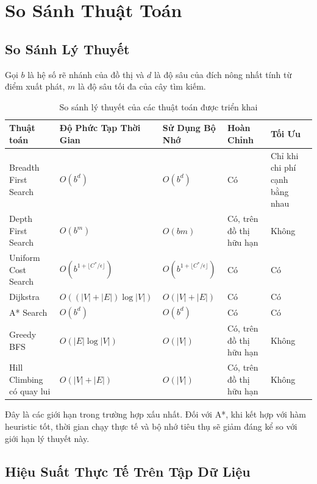 
\chapter{So Sánh Thuật Toán}
\label{chap:algorithm-comparison}

\section{So Sánh Lý Thuyết}

Gọi $b$ là hệ số rẽ nhánh của đồ thị và $d$ là độ sâu của đích nông nhất tính từ điểm xuất phát, $m$ là độ sâu tối đa của cây tìm kiếm.

\begin{table}[h!]
\centering
\caption{So sánh lý thuyết của các thuật toán được triển khai}
\scriptsize
\begin{tabular}{p{3.0cm}p{3.0cm}p{2.8cm}p{1.8cm}p{3.0cm}}
\toprule
Thuật toán & Độ Phức Tạp Thời Gian & Sử Dụng Bộ Nhớ & Hoàn Chỉnh & Tối Ưu \\
\midrule
Breadth First Search & $O(b^d)$ & $O(b^d)$ & Có & Chỉ khi chi phí cạnh bằng nhau \\
Depth First Search & $O(b^m)$ & $O(bm)$ & Có, trên đồ thị hữu hạn & Không \\
Uniform Cost Search & $O(b^{1 + \lfloor C^*/\epsilon \rfloor})$ & $O(b^{1 + \lfloor C^*/\epsilon \rfloor})$ & Có & Có \\
Dijkstra & $O((|V|+|E|)\log |V|)$ & $O(|V|+|E|)$ & Có & Có \\
A* Search & $O(b^d)$ & $O(b^d)$ & Có & Có \\
Greedy BFS & $O(|E|\log |V|)$ & $O(|V|)$ & Có, trên đồ thị hữu hạn & Không \\
Hill Climbing có quay lui & $O(|V|+|E|)$ & $O(|V|)$ & Có, trên đồ thị hữu hạn & Không \\
\bottomrule
\end{tabular}
\end{table}

Đây là các giới hạn trong trường hợp xấu nhất. Đối với A*, khi kết hợp với hàm heuristic tốt, thời gian chạy thực tế và bộ nhớ tiêu thụ sẽ giảm đáng kể so với giới hạn lý thuyết này.

\section{Hiệu Suất Thực Tế Trên Tập Dữ Liệu}

